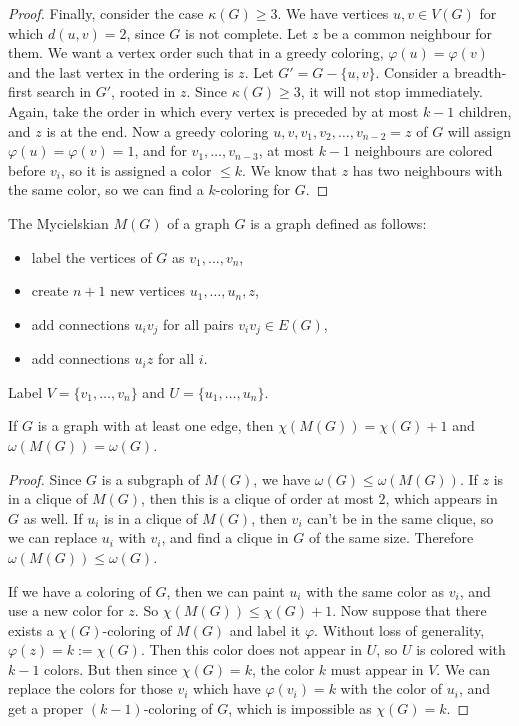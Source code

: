 \begin{proof}
  Finally, consider the case $\kappa(G) \ge 3$.
  We have vertices $u,v \in V(G)$ for which $d(u,v) = 2$, since $G$ is not
  complete.
  Let $z$ be a common neighbour for them.
  We want a vertex order such that in a greedy coloring, $\varphi(u) =
  \varphi(v)$ and the last vertex in the ordering is $z$.
  Let $G' = G - \{u,v\}$.
  Consider a breadth-first search in $G'$, rooted in $z$.
  Since $\kappa(G) \ge 3$, it will not stop immediately.
  Again, take the order in which every vertex is preceded by at most $k-1$
  children, and $z$ is at the end.
  Now a greedy coloring $u, v, v_1, v_2, \ldots, v_{n-2}=z$ of $G$ will assign
  $\varphi(u) = \varphi(v) = 1$, and for $v_1, \ldots, v_{n-3}$, at most $k-1$
  neighbours are colored before $v_i$, so it is assigned a color $\le k$.
  We know that $z$ has two neighbours with the same color, so we can find a
  $k$-coloring for $G$.
\end{proof}


The Mycielskian $M(G)$ of a graph $G$ is a graph defined as follows:
\begin{itemize}
\item label the vertices of $G$ as $v_1, \ldots, v_n$,
\item create $n+1$ new vertices $u_1, \ldots, u_n, z$,
\item add connections $u_i v_j$ for all pairs $v_i v_j \in E(G)$,
\item add connections $u_i z$ for all $i$.
\end{itemize}
Label $V = \{v_1, \ldots, v_n\}$ and $U = \{u_1, \ldots, u_n\}$.

\begin{theorem}
  If $G$ is a graph with at least one edge, then $\chi(M(G)) = \chi(G) + 1$ and
  $\omega(M(G)) = \omega(G)$.
\end{theorem}

\begin{proof}
  Since $G$ is a subgraph of $M(G)$, we have $\omega(G) \le \omega(M(G))$.
  If $z$ is in a clique of $M(G)$, then this is a clique of order at most $2$,
  which appears in $G$ as well.
  If $u_i$ is in a clique of $M(G)$, then $v_i$ can't be in the same clique, so
  we can replace $u_i$ with $v_i$, and find a clique in $G$ of the same size.
  Therefore $\omega(M(G)) \le \omega(G)$.

  If we have a coloring of $G$, then we can paint $u_i$ with the same color as
  $v_i$, and use a new color for $z$.
  So $\chi(M(G)) \le \chi(G)+1$.
  Now suppose that there exists a $\chi(G)$-coloring of $M(G)$ and label it
  $\varphi$.
  Without loss of generality, $\varphi(z) = k := \chi(G)$.
  Then this color does not appear in $U$, so $U$ is colored with $k-1$ colors.
  But then since $\chi(G) = k$, the color $k$ must appear in $V$.
  We can replace the colors for those $v_i$ which have $\varphi(v_i) = k$ with
  the color of $u_i$, and get a proper $(k-1)$-coloring of $G$, which is
  impossible as $\chi(G) = k$.
  \protislovje{}
\end{proof}


